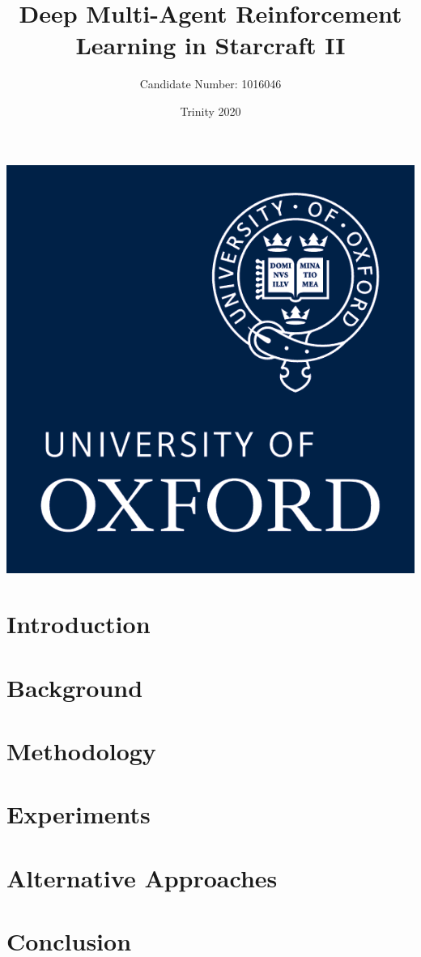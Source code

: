 \documentclass{article}
\title{Deep Multi-Agent Reinforcement Learning in Starcraft II}
\author{Candidate Number: 1016046}
\date{Trinity 2020}
\begin{document}
\maketitle
\thispagestyle{empty}
\vfill
\vfill
\begin{center}
    \includegraphics[scale=0.2]{images/ox_logo.png}
\end{center}

\newpage


\begin{abstract}
    
\end{abstract}
\newpage
\tableofcontents
\newpage
\section{Introduction}


\section{Background}


\section{Methodology}


\section{Experiments}


\section{Alternative Approaches}


\section{Conclusion}




\end{document}
